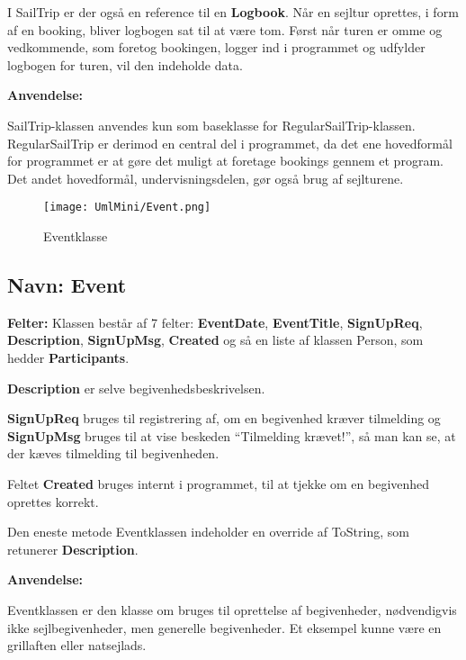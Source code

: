 I SailTrip er der også en reference til en \textbf{Logbook}.
Når en sejltur oprettes, i form af en booking, bliver logbogen sat til at være tom.
Først når turen er omme og vedkommende, som foretog bookingen, logger ind i programmet og udfylder logbogen for turen, vil den indeholde data.

\textbf{Anvendelse:}

SailTrip-klassen anvendes kun som baseklasse for RegularSailTrip-klassen. 
RegularSailTrip er derimod en central del i programmet, da det ene hovedformål for programmet er at gøre det muligt at foretage bookings gennem et program. Det andet hovedformål, undervisningsdelen, gør også brug af sejlturene. 

\begin{wrapfigure}[10]{R}{0.5\textwidth}
    \label{img:event}
    \vspace{-20pt}
    \begin{center}
        \texttt{[image: UmlMini/Event.png]}
    \end{center}
    \vspace{-20pt}
    \caption{Eventklasse}
\end{wrapfigure}

\subsection*{Navn: Event}

\textbf{Felter:}
Klassen består af 7 felter: \textbf{EventDate}, \textbf{EventTitle}, \textbf{SignUpReq}, \textbf{Description}, \textbf{SignUpMsg}, \textbf{Created} og så en liste af klassen Person, som hedder \textbf{Participants}.

\textbf{Description} er selve begivenhedsbeskrivelsen. 

\textbf{SignUpReq} bruges til registrering af, om en begivenhed kræver tilmelding og \textbf{SignUpMsg} bruges til at vise beskeden ``Tilmelding krævet!'', så man kan se, at der kæves tilmelding til begivenheden. 

Feltet \textbf{Created} bruges internt i programmet, til at tjekke om en begivenhed oprettes korrekt.

Den eneste metode Eventklassen indeholder en override af ToString, som retunerer \textbf{Description}.

\textbf{Anvendelse:}

Eventklassen er den klasse om bruges til oprettelse af  begivenheder, nødvendigvis ikke sejlbegivenheder, men generelle begivenheder. Et eksempel kunne være en grillaften eller natsejlads.

